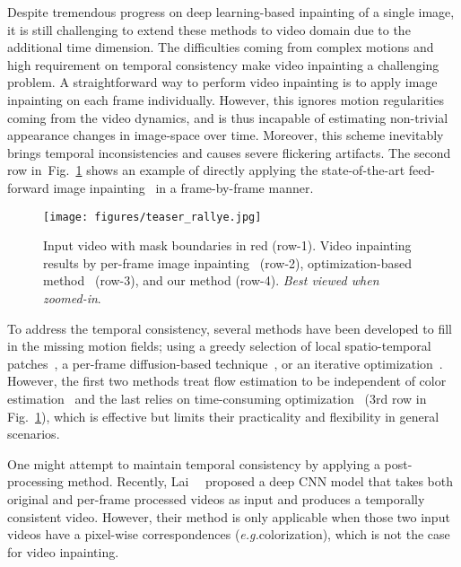 \documentclass[10pt,twocolumn,letterpaper]{article}
\newcommand{\figref}[1]{Fig.~\ref{#1}}
\renewcommand{\eg}{\textit{e.g.}}
\begin{document}
Despite tremendous progress on deep learning-based inpainting of a single image, it is still challenging to extend these methods to video domain due to the additional time dimension. The difficulties coming from complex motions and high requirement on temporal consistency make video inpainting a challenging problem. A straightforward way to perform video inpainting is to apply image inpainting on each frame individually. However, this ignores motion regularities coming from the video dynamics, and is thus incapable of estimating non-trivial appearance changes in image-space over time. Moreover, this scheme inevitably brings temporal inconsistencies and causes severe flickering artifacts. The second row in~\figref{fig:teaser} shows an example of directly applying the state-of-the-art feed-forward image inpainting~\cite{yu2018generative} in a frame-by-frame manner.

\begin{figure}[t]
\def\arraystretch{0.5}
\texttt{[image: figures/teaser\_rallye.jpg]}
\caption{Input video with mask boundaries in red (row-1). Video inpainting results by per-frame image inpainting~\cite{yu2018generative} (row-2), optimization-based method~\cite{huang2016temporally} (row-3), and our method (row-4). \textit{Best viewed when zoomed-in}.}
\label{fig:teaser}
\end{figure}

To address the temporal consistency, several methods have been developed to fill in the missing motion fields; using a greedy selection of local spatio-temporal patches~\cite{shiratori2006video}, a per-frame diffusion-based technique~\cite{matsushita2006full}, or an iterative optimization~\cite{huang2016temporally}. However, the first two methods treat flow estimation to be independent of color estimation~\cite{shiratori2006video,matsushita2006full} and the last relies on time-consuming optimization~\cite{huang2016temporally} (3rd row in \figref{fig:teaser}), which is effective but limits their practicality and flexibility in general scenarios.



One might attempt to maintain temporal consistency by applying a post-processing method. Recently, Lai~\etal~\cite{lai2018learning} proposed a deep CNN model that takes both original and per-frame processed videos as input and produces a temporally consistent video. However, their method is only applicable when those two input videos have a pixel-wise correspondences (\eg colorization), which is not the case for video inpainting. 
\end{document}
